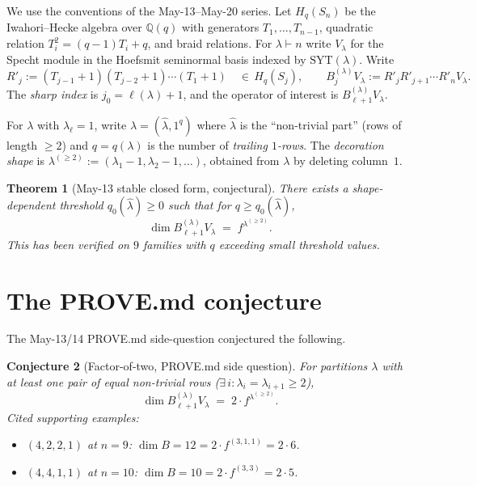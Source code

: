 \documentclass[11pt]{article}
\newtheorem{theorem}{Theorem}
\newtheorem{conjecture}[theorem]{Conjecture}
\theoremstyle{definition}
\begin{document}
We use the conventions of the May-13--May-20 series.  Let
$H_q(S_n)$ be the Iwahori--Hecke algebra over $\mathbb{Q}(q)$ with
generators $T_1, \ldots, T_{n-1}$, quadratic relation $T_i^2 = (q-1)T_i
+ q$, and braid relations.  For $\lambda \vdash n$ write $V_\lambda$ for
the Specht module in the Hoefsmit seminormal basis indexed by
$\mathrm{SYT}(\lambda)$.  Write
\[
   R'_j := (T_{j-1}{+}1)(T_{j-2}{+}1)\cdots(T_1{+}1)
   \quad\in\, H_q(S_j),
   \qquad
   B_j^{(\lambda)} V_\lambda := R'_j R'_{j+1}\cdots R'_n V_\lambda.
\]
The \emph{sharp index} is $j_0 = \ell(\lambda) + 1$, and the operator
of interest is $B_{\ell+1}^{(\lambda)} V_\lambda$.

For $\lambda$ with $\lambda_\ell = 1$, write $\lambda =
(\widehat\lambda, 1^q)$ where $\widehat\lambda$ is the
``non-trivial part'' (rows of length $\ge 2$) and $q = q(\lambda)$ is
the number of \emph{trailing $1$-rows}.  The \emph{decoration shape} is
$\lambda^{(\ge 2)} := (\lambda_1 - 1, \lambda_2 - 1, \ldots)$, obtained
from $\lambda$ by deleting column~$1$.

\begin{theorem}[May-13 stable closed form, conjectural]
\label{thm:stable}
There exists a shape-dependent threshold $q_0(\widehat\lambda) \ge 0$
such that for $q \ge q_0(\widehat\lambda)$,
\[
   \dim B_{\ell + 1}^{(\lambda)} V_\lambda \;=\; f^{\lambda^{(\ge 2)}}.
\]
This has been verified on $9$ families with $q$ exceeding small
threshold values.
\end{theorem}

\section{The PROVE.md conjecture}\label{sec:prove-md}

The May-13/14 PROVE.md side-question conjectured the following.

\begin{conjecture}[Factor-of-two, PROVE.md side question]\label{conj:factor2}
For partitions $\lambda$ with at least one pair of equal non-trivial
rows ($\exists\, i : \lambda_i = \lambda_{i+1} \ge 2$),
\[
   \dim B_{\ell + 1}^{(\lambda)} V_\lambda \;=\; 2 \cdot f^{\lambda^{(\ge 2)}}.
\]
Cited supporting examples:
\begin{itemize}
\item $(4, 2, 2, 1)$ at $n = 9$: $\dim B = 12 = 2 \cdot f^{(3,1,1)} = 2{\cdot}6$.
\item $(4, 4, 1, 1)$ at $n = 10$: $\dim B = 10 = 2 \cdot f^{(3,3)} = 2{\cdot}5$.
\end{itemize}
\end{conjecture}
\end{document}
